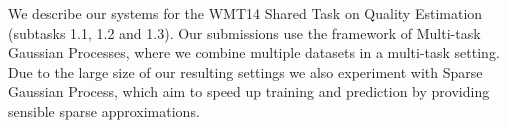 We describe our systems for the WMT14 Shared Task on Quality Estimation (subtasks 1.1, 1.2 and 1.3). Our submissions use the framework of Multi-task Gaussian Processes, where we combine multiple datasets in a multi-task setting. Due to the large size of our resulting settings we also experiment with Sparse Gaussian Process, which aim to speed up training and prediction by providing sensible sparse approximations.
